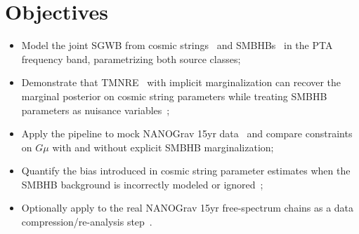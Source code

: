 \section{Objectives}\label{sec:4-objectives}
\begin{itemize}
    \item Model the joint SGWB from cosmic strings~\cite{martins_extending_2002,blanco-pillado_number_2014} and SMBHBs~\cite{sesana_insights_2013} in the PTA frequency band, parametrizing both source classes;
    \item Demonstrate that TMNRE~\cite{miller_truncated_2021} with implicit marginalization can recover the marginal posterior on cosmic string parameters while treating SMBHB parameters as nuisance variables~\cite{cranmer_frontier_2020};
    \item Apply the pipeline to mock NANOGrav 15yr data~\cite{afzal_nanograv_2023,johnson_nanograv_2024} and compare constraints on $G\mu$ with and without explicit SMBHB marginalization;
    \item Quantify the bias introduced in cosmic string parameter estimates when the SMBHB background is incorrectly modeled or ignored~\cite{aggarwal_nanograv_2020};
    \item Optionally apply to the real NANOGrav 15yr free-spectrum chains as a data compression/re-analysis step~\cite{afzal_nanograv_2023}.
\end{itemize}

